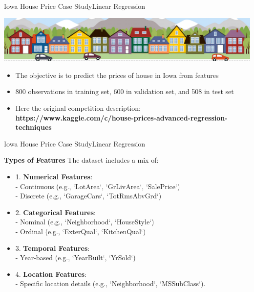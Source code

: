 \documentclass[11pt]{beamer}
\begin{document}
\begin{frame}{Iowa House Price Case Study}{Linear Regression}
\begin{center}
\includegraphics[scale=.3]{../05-pictures/lesson-3-1_pic_1.png} 
\end{center}
	\begin{itemize}
		\item The objective is to predict the prices of house in Iowa from features
		\item 800 observations in training set, 600 in validation set, and 508 in test set
		\item Here the original competition description: \textbf{https://www.kaggle.com/c/house-prices-advanced-regression-techniques}
	\end{itemize}
\end{frame}
\begin{frame}{Iowa House Price Case Study}{Linear Regression}

\textbf{Types of Features}
\vspace{0.5cm}
The dataset includes a mix of:
\begin{itemize}
\item 1. \textbf{Numerical Features}:\\
   - Continuous (e.g., `LotArea`, `GrLivArea`, `SalePrice`)\\
   - Discrete (e.g., `GarageCars`, `TotRmsAbvGrd`)
\item 2. \textbf{Categorical Features}:\\
   - Nominal (e.g., `Neighborhood`, `HouseStyle`)\\
   - Ordinal (e.g., `ExterQual`, `KitchenQual`)
\item 3. \textbf{Temporal Features}:\\
   - Year-based (e.g., `YearBuilt`, `YrSold`)
\item 4. \textbf{Location Features}:\\
   - Specific location details (e.g., `Neighborhood`, `MSSubClass`).
\end{itemize}
\end{frame}
\end{document}
